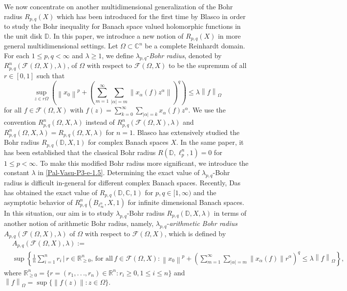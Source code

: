 \documentclass[a4paper,12pt]{amsart}
\theoremstyle{definition}
\newcommand{\norm}[1]{\left\lVert#1\right\rVert}
\begin{document}
\vspace{2mm}
We now concentrate on another multidimensional generalization of the Bohr radius $R_{p,q}(X)$ which has been introduced for the first time by Blasco \cite{Blasco-OTAA-2010} in order to study the Bohr inequality for Banach space valued holomorphic functions in the unit disk $\mathbb{D}$. In this paper, we introduce a new notion of $R_{p,q}(X)$ in more general multidimensional settings. Let $\Omega \subset \mathbb{C}^n$ be a complete Reinhardt domain. For each $1\leq p, q<\infty$ and $\lambda\geq 1$, we define $\lambda_{p,q}$-\textit{Bohr radius}, denoted by $R^n_{p,q}(\mathcal{F}(\Omega, X), \lambda)$, of $\Omega$ with respect to $\mathcal{F}(\Omega, X)$ to be the supremum of all $r \in [0,1]$ such that
\begin{equation}\label{Pal-Vasu-P3-e-1.5}
\sup_{z\in r\Omega}	\left(\norm{x_0}^p+
	\left(\sum_{m=1}^{\infty}\sum_{|\alpha|=m}\norm{x_{\alpha}(f)z^{\alpha}} \right)^q \right) \leq \lambda \norm{f}_{\Omega}
\end{equation}
for all $f \in \mathcal{F}(\Omega, X)$ with $f(z)=\sum_{k=0}^{\infty} \sum_{|\alpha|=k} x_{\alpha}(f) z^{\alpha}$. We use the convention $R^n_{p,q}(\Omega,X,\lambda)$ instead of $R^n_{p,q}(\mathcal{F}(\Omega, X),\lambda)$ and $R^n_{p,q}(\Omega,X,\lambda)=R_{p,q}(\Omega,X,\lambda)$ for $n=1$. 
Blasco \cite{Blasco-OTAA-2010} has extensively studied the Bohr radius $R_{p,q}(\mathbb{D},X,1)$ for complex Banach spaces $X$. In the same paper, it has been established \cite[Theorem 1.2]{Blasco-OTAA-2010} that the classical Bohr radius $R(\mathbb{D}, \ell^n_p,1)=0$ for $1\leq p<\infty$. To make this modified Bohr radius more significant, we introduce the constant $\lambda$ in \eqref{Pal-Vasu-P3-e-1.5}. Determining the exact value of $\lambda_{p,q}$-Bohr radius is difficult in-general for different complex Banach spaces. Recently, Das \cite{das-2023} has obtained the exact value of $R_{p,q}(\mathbb{D},\mathbb{C},1)$ for $p,q\in[1,\infty)$ and the asymptotic behavior of $R^n_{p,q}(B_{\ell^n_{\infty}},X,1)$ for infinite dimensional Banach spaces. In this situation, our aim is to study $\lambda_{p,q}$-Bohr radius $R_{p,q}(\mathbb{D},X,\lambda)$ in terms of another notion of arithmetic Bohr radius, namely, $\lambda_{p,q}$-\textit{arithmetic Bohr radius} $A_{p,q}(\mathcal{F}(\Omega, X), \lambda)$ of $\Omega$ with respect to $\mathcal{F}(\Omega,X)$, which is defined by 
\begin{align*}
	&A_{p,q}(\mathcal{F}(\Omega, X), \lambda) :=\\& \sup \left\{\frac{1}{n}\sum_{i=1}^{n}r_i \,|\, r\in \mathbb{R}^{n}_{\geq 0},\, \mbox{for all}\, f\in \mathcal{F}(\Omega, X):\norm{x_0}^p+
	\left(\sum_{m=1}^{\infty}\sum_{|\alpha|=m}\norm{x_{\alpha}(f)} r^{\alpha}\right)^q \leq \lambda \norm{f}_{\Omega}\right\},
\end{align*}
where $\mathbb{R}^n_{\geq 0}=\{r=(r_1,.\,.\,., r_n) \in \mathbb{R}^n: r_i\geq 0, 1\leq i\leq n\}$ and $\norm{f}_{\Omega}=\sup \{\|f(z)\|: z \in \Omega\}$.\\[2mm]
\end{document}
